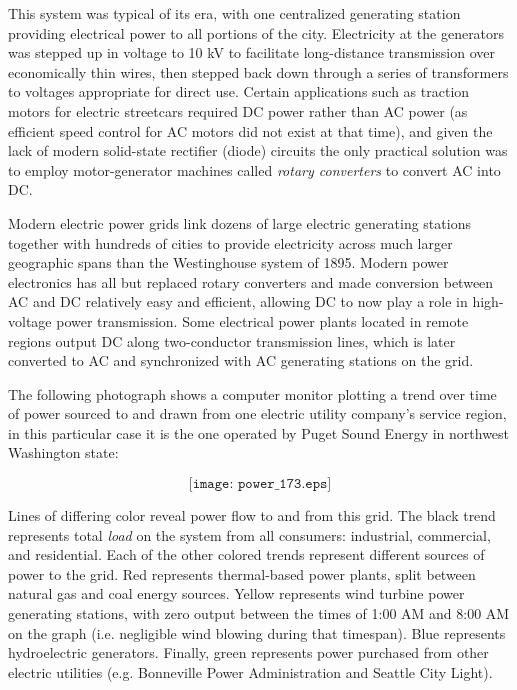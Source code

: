 This system was typical of its era, with one centralized generating station providing electrical power to all portions of the city.  Electricity at the generators was stepped up in voltage to 10 kV to facilitate long-distance transmission over economically thin wires, then stepped back down through a series of transformers to voltages appropriate for direct use.  Certain applications such as traction motors for electric streetcars required DC power rather than AC power (as efficient speed control for AC motors did not exist at that time), and given the lack of modern solid-state rectifier (diode) circuits the only practical solution was to employ motor-generator machines called \textit{rotary converters} to convert AC into DC.

Modern electric power grids link dozens of large electric generating stations together with hundreds of cities to provide electricity across much larger geographic spans than the Westinghouse system of 1895.  Modern power electronics has all but replaced rotary converters and made conversion between AC and DC relatively easy and efficient, allowing DC to now play a role in high-voltage power transmission.  Some electrical power plants located in remote regions output DC along two-conductor transmission lines, which is later converted to AC and synchronized with AC generating stations on the grid.

\vskip 10pt

\filbreak

The following photograph shows a computer monitor plotting a trend over time of power sourced to and drawn from one electric utility company's service region, in this particular case it is the one operated by Puget Sound Energy in northwest Washington state:  

$$\texttt{[image: power\_173.eps]}$$

Lines of differing color reveal power flow to and from this grid.  The black trend represents total \textit{load} on the system from all consumers: industrial, commercial, and residential.  Each of the other colored trends represent different sources of power to the grid.  Red represents thermal-based power plants, split between natural gas and coal energy sources.  Yellow represents wind turbine power generating stations, with zero output between the times of 1:00 AM and 8:00 AM on the graph (i.e. negligible wind blowing during that timespan).  Blue represents hydroelectric generators.  Finally, green represents power purchased from other electric utilities (e.g. Bonneville Power Administration and Seattle City Light).    

